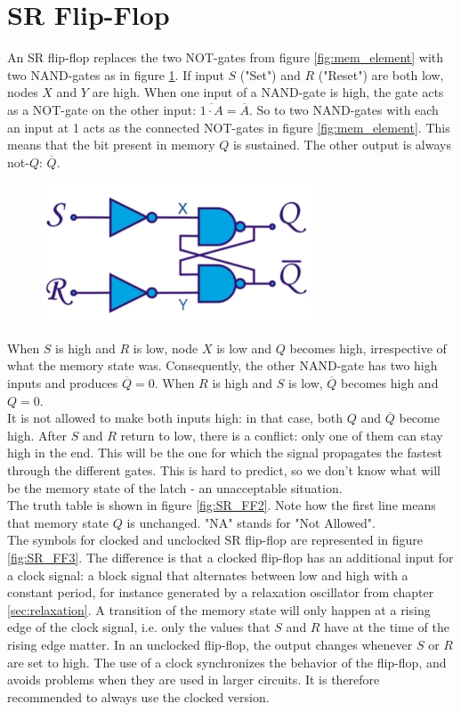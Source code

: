 \section{SR Flip-Flop}
An SR flip-flop replaces the two NOT-gates from figure \ref{fig:mem_element} with two NAND-gates as in figure \ref{fig:SR_FF}. If input $S$ ("Set") and $R$ ("Reset") are both low, nodes $X$ and $Y$ are high. When one input of a NAND-gate is high, the gate acts as a NOT-gate on the other input: $\overline{1 \cdot A} =\overline{A}$. So to two NAND-gates with each an input at 1 acts as the connected NOT-gates in figure \ref{fig:mem_element}. This means that the bit present in memory $Q$ is sustained. The other output is always not-$Q$: $\overline{Q}$.
\begin{figure}[h!]
	\centering
	\includegraphics[width=8cm]{figures/ch17/SR_FF.jpg}
	\caption{}
	\label{fig:SR_FF}
\end{figure}
When $S$ is high and $R$ is low, node $X$ is low and $Q$ becomes high, irrespective of what the memory state was. Consequently, the other NAND-gate has two high inputs and produces $\overline{Q} = 0$. When $R$ is high and $S$ is low, $\overline{Q}$ becomes high and $Q = 0$.\\
It is not allowed to make both inputs high: in that case, both $Q$ and $\overline{Q}$ become high. After $S$ and $R$ return to low, there is a conflict: only one of them can stay high in the end. This will be the one for which the signal propagates the fastest through the different gates. This is hard to predict, so we don't know what will be the memory state of the latch - an unacceptable situation.\\
The truth table is shown in figure \ref{fig:SR_FF2}. Note how the first line means that memory state $Q$ is unchanged. "NA" stands for "Not Allowed".\\
The symbols for clocked and unclocked SR flip-flop are represented in figure \ref{fig:SR_FF3}. The difference is that a clocked flip-flop has an additional input for a clock signal: a block signal that alternates between low and high with a constant period, for instance generated by a relaxation oscillator from chapter \ref{sec:relaxation}. A transition of the memory state will only happen at a rising edge of the clock signal, i.e. only the values that $S$ and $R$ have at the time of the rising edge matter. In an unclocked flip-flop, the output changes whenever $S$ or $R$ are set to high. The use of a clock synchronizes the behavior of the flip-flop, and avoids problems when they are used in larger circuits. It is therefore recommended to always use the clocked version.\\

